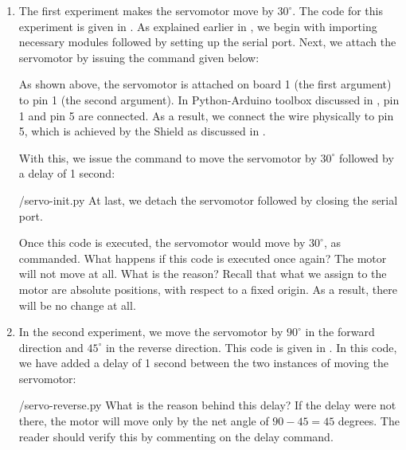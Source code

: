 \begin{enumerate}
  \item The first experiment makes the servomotor move by $30^\circ$. The code for this experiment is
        given in . As explained earlier in , 
        we begin with importing necessary modules followed by setting up the serial port.
        Next, we attach the servomotor by issuing the command given below:
        
        As shown above, the servomotor is attached on board 1 (the first argument)
        to pin 1 (the second argument).  In Python-Arduino toolbox discussed 
        in , pin 1 and pin 5 are connected. As a result, we connect the wire physically to
        pin 5, which is achieved by the Shield as discussed in .
        
        With this, we issue the command to move the servomotor by $30^\circ$ followed by a delay of 
        1 second:
        
        {\LocSERpycode/servo-init.py}
        At last, we  detach the servomotor followed by closing the serial port. 
        
        Once this code is executed, the servomotor would move by
        $30^\circ$, as commanded.  What happens if this code is executed
        once again?  The motor will not move at all.  What is the reason?
        Recall that what we assign to the motor are absolute positions, with
        respect to a fixed origin.  As a result, there will be no change at
        all. 
        
  \item In the second experiment, we move the servomotor by $90^\circ$ in the
        forward direction and $45^\circ$ in the reverse direction.  This
        code is given in .  In this code, 
        we have added a delay of 1 second between the two instances of 
        moving the servomotor: 
        
        {\LocSERpycode/servo-reverse.py}
        What is the reason behind this delay?  If the delay were not
        there, the motor will move only by the net angle of $90-45 = 45$
        degrees.  The reader should verify this by commenting on the delay
        command. 
        
        

\end{enumerate}
